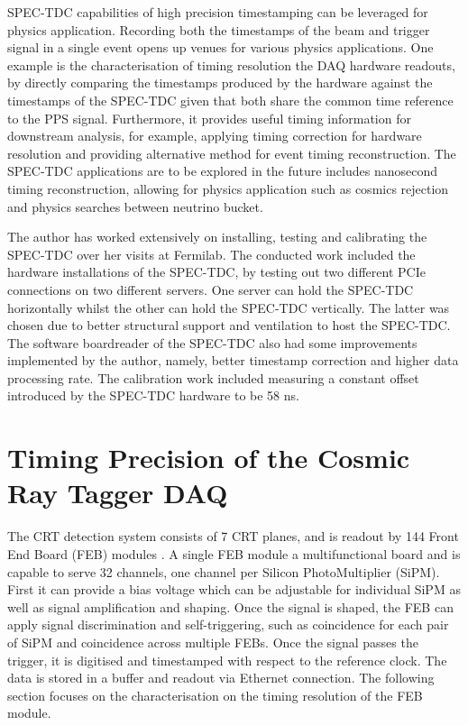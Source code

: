 SPEC-TDC capabilities of high precision timestamping can be leveraged for physics application.
Recording both the timestamps of the beam and trigger signal in a single event opens up venues for various physics applications. 
One example is the characterisation of timing resolution the DAQ hardware readouts, by directly comparing the timestamps produced by the hardware against the timestamps of the SPEC-TDC given that both share the common time reference to the PPS signal.
Furthermore, it provides useful timing information for downstream analysis, for example, applying timing correction for hardware resolution and providing alternative method for event timing reconstruction. 
The SPEC-TDC applications are to be explored in the future includes nanosecond timing reconstruction, allowing for physics application such as cosmics rejection and physics searches between neutrino bucket.

The author has worked extensively on installing, testing and calibrating the SPEC-TDC over her visits at Fermilab.
The  conducted work included the hardware installations of the SPEC-TDC, by testing out two different PCIe connections on two different servers. 
One server can hold the SPEC-TDC horizontally whilst the other can hold the SPEC-TDC vertically. 
The latter was chosen due to better structural support and ventilation to host the SPEC-TDC.
The software boardreader of the SPEC-TDC also had some improvements implemented by the author, namely, better timestamp correction and higher data processing rate.
The calibration work included measuring a constant offset introduced by the SPEC-TDC hardware to be 58 ns.

\section{Timing Precision of the Cosmic Ray Tagger DAQ}
\label{section5.3}

The CRT detection system consists of 7 CRT planes, and is readout by 144 Front End Board (FEB) modules \cite{}. 
A single FEB module a multifunctional board and is capable to serve 32 channels, one channel per Silicon PhotoMultiplier (SiPM). 
First it can provide a bias voltage which can be adjustable for individual SiPM as well as signal amplification and shaping.
Once the signal is shaped, the FEB can apply signal discrimination and self-triggering, such as coincidence for each pair of SiPM and coincidence across multiple FEBs.
Once the signal passes the trigger, it is digitised and timestamped with respect to the reference clock.
The data is stored in a buffer and readout via Ethernet connection.
The following section focuses on the characterisation on the timing resolution of the FEB module.

